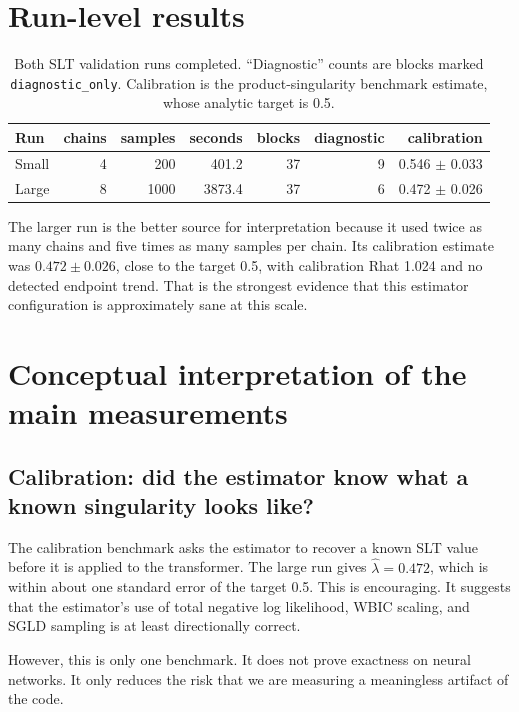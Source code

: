 \documentclass[11pt]{article}
\begin{document}
\section{Run-level results}

\begin{table}[h]
\centering
\begin{tabular}{lrrrrrr}
\toprule
Run & chains & samples & seconds & blocks & diagnostic & calibration \\
\midrule
Small & 4 & 200 & 401.2 & 37 & 9 & 0.546 $\pm$ 0.033 \\
Large & 8 & 1000 & 3873.4 & 37 & 6 & 0.472 $\pm$ 0.026 \\
\bottomrule
\end{tabular}
\caption{Both SLT validation runs completed. ``Diagnostic'' counts are blocks
marked \texttt{diagnostic\_only}. Calibration is the product-singularity
benchmark estimate, whose analytic target is 0.5.}
\end{table}

The larger run is the better source for interpretation because it used twice as
many chains and five times as many samples per chain. Its calibration estimate
was \(0.472 \pm 0.026\), close to the target 0.5, with calibration Rhat 1.024
and no detected endpoint trend. That is the strongest evidence that this
estimator configuration is approximately sane at this scale.

\section{Conceptual interpretation of the main measurements}

\subsection{Calibration: did the estimator know what a known singularity looks like?}

The calibration benchmark asks the estimator to recover a known SLT value before
it is applied to the transformer. The large run gives \(\hat\lambda=0.472\),
which is within about one standard error of the target 0.5. This is encouraging.
It suggests that the estimator's use of total negative log likelihood, WBIC
scaling, and SGLD sampling is at least directionally correct.

However, this is only one benchmark. It does not prove exactness on neural
networks. It only reduces the risk that we are measuring a meaningless artifact
of the code.
\end{document}
